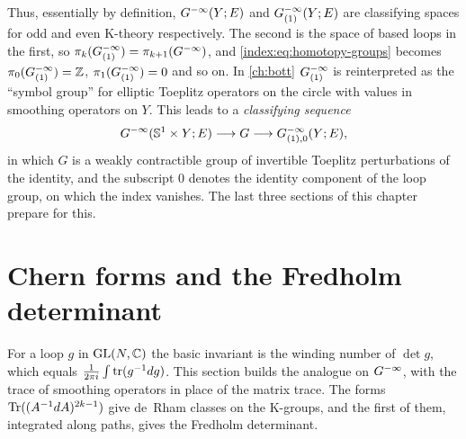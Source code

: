 \begin{remark}\label{index:rem:classifying}
  Thus, essentially by definition, $G^{-\infty}(Y;E)$ and $G^{-\infty}_{(1)}(Y;E)$ are
  classifying spaces for odd and even K-theory respectively. The second is the
  space of based loops in the first, so
  $\pi_k(G^{-\infty}_{(1)})=\pi_{k+1}(G^{-\infty})$, and \eqref{index:eq:homotopy-groups}
  becomes $\pi_0(G^{-\infty}_{(1)})=\mathbb{Z}$, $\pi_1(G^{-\infty}_{(1)})=0$ and so on. In \cref{ch:bott}
  $G^{-\infty}_{(1)}$ is reinterpreted as the ``symbol group'' for elliptic Toeplitz
  operators on the circle with values in smoothing operators on $Y$. This
  leads to a \emph{classifying sequence}
  \begin{equation}\label{index:eq:classifying}
    G^{-\infty}(\mathbb{S}^1\times Y;E)\longrightarrow G\longrightarrow
    G^{-\infty}_{(1),0}(Y;E),
  \end{equation}
  in which $G$ is a weakly contractible group of invertible Toeplitz
  perturbations of the identity, and the subscript $0$ denotes the identity
  component of the loop group, on which the index vanishes. The last three
  sections of this chapter prepare for this.
\end{remark}

\section{Chern forms and the Fredholm determinant}\label{index:sec:chern}

For a loop $g$ in $\operatorname{GL}(N,\mathbb{C})$ the basic invariant is the winding number of
$\det g$, which equals $\frac1{2\pi i}\int\operatorname{tr}(g^{-1}dg)$. This section builds the
analogue on $G^{-\infty}$, with the trace of smoothing operators in place of the matrix
trace. The forms $\operatorname{Tr}((A^{-1}dA)^{2k-1})$ give de~Rham classes on the K-groups,
and the first of them, integrated along paths, gives the Fredholm determinant.

